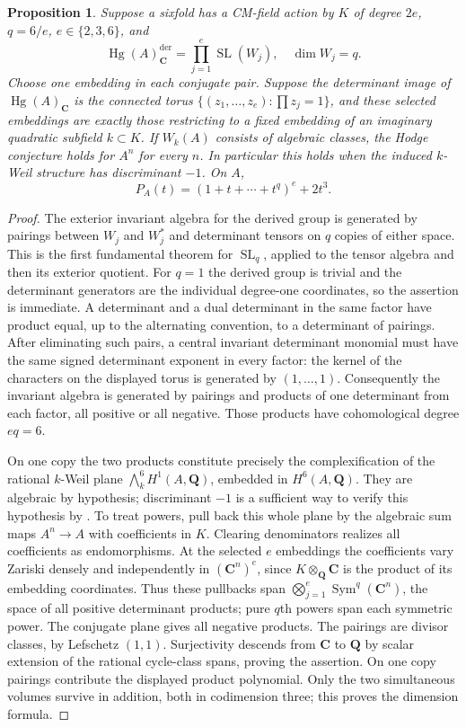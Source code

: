 \documentclass[11pt,reqno]{article}
\theoremstyle{emphasizedplain}
\newtheorem{proposition}[theorem]{Proposition}
\theoremstyle{emphasizeddefinition}
\theoremstyle{emphasizeddefinition}
\DeclareMathOperator{\Hg}{Hg}
\DeclareMathOperator{\SL}{SL}
\DeclareMathOperator{\Sym}{Sym}
\newcommand{\Q}{\mathbf Q}
\newcommand{\C}{\mathbf C}
\newcommand{\dd}{\mathrm{der}}
\begin{document}
\begin{proposition}\label{p:coupled-det}
Suppose a sixfold has a CM-field action by $K$ of degree
$2e$, $q=6/e$, $e\in\{2,3,6\}$, and
\[
 \Hg(A)_\C^{\dd}=\prod_{j=1}^e\SL(W_j),\quad \dim W_j=q.
\]
Choose one embedding in each conjugate pair. Suppose the determinant
image of $\Hg(A)_\C$ is the connected torus
$\{(z_1,\ldots,z_e):\prod z_j=1\}$, and these selected embeddings are
exactly those restricting to a fixed embedding of an imaginary quadratic
subfield $k\subset K$. If $W_k(A)$ consists of algebraic classes,
the Hodge conjecture holds for $A^n$ for every $n$. In particular
this holds when the induced $k$-Weil structure has discriminant $-1$.
On $A$,
\[
 P_A(t)=(1+t+\cdots+t^q)^e+2t^3.
\]
\end{proposition}
\begin{proof}
The exterior invariant algebra for the derived group is generated by
pairings between $W_j$ and $W_j^*$ and determinant tensors on $q$ copies
of either space. This is the first fundamental theorem for $\SL_q$,
applied to the tensor algebra and then its exterior quotient. For $q=1$
the derived group is trivial and the determinant generators are the
individual degree-one coordinates, so the assertion is immediate. A determinant
and a dual determinant in the same factor have product equal, up to the
alternating convention, to a determinant of pairings. After eliminating
such pairs, a central invariant determinant monomial must have the same
signed determinant exponent in every factor: the kernel of the characters
on the displayed torus is generated by $(1,\ldots,1)$. Consequently the
invariant algebra is generated by pairings and products of one determinant
from each factor, all positive or all negative. Those products have
cohomological degree $eq=6$.

On one copy the two products constitute precisely the complexification
of the rational $k$-Weil plane $\bigwedge_k^6 H^1(A,\Q)$, embedded in
$H^6(A,\Q)$. They are algebraic by hypothesis; discriminant $-1$
is a sufficient way to verify this hypothesis by
\cite[Theorem 1.5.1]{Markman}. To treat powers, pull back this whole plane
by the algebraic sum maps $A^n\to A$ with coefficients in $K$. Clearing
denominators realizes all coefficients as endomorphisms. At the selected
$e$ embeddings the coefficients vary Zariski densely and independently
in $(\C^n)^e$, since $K\otimes_\Q\C$ is the product of its embedding
coordinates. Thus these pullbacks span
$\bigotimes_{j=1}^e\Sym^q(\C^n)$, the space of all positive determinant
products; pure $q$th powers span each symmetric power. The conjugate plane
gives all negative products. The pairings are divisor classes, by
Lefschetz $(1,1)$. Surjectivity descends from $\C$ to $\Q$ by scalar
extension of the rational cycle-class spans, proving the assertion.
On one copy pairings contribute the displayed product polynomial. Only
the two simultaneous volumes survive in addition, both in codimension
three; this proves the dimension formula.
\end{proof}
\end{document}
